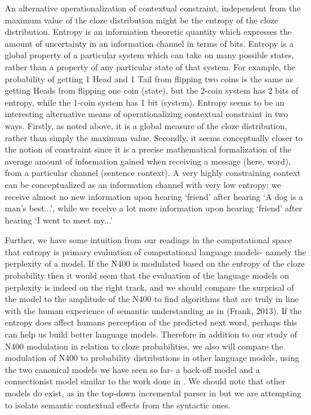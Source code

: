 \documentclass{article}
\begin{document}
An alternative operationalization of contextual constraint, independent from the maximum value of the cloze distribution might be the entropy of the cloze distribution. Entropy is an information theoretic quantity which expresses the amount of uncertainty in an information channel in terms of bits.  Entropy is a global property of a particular system which can take on many possible states, rather than a property of any particular state of that system. For example, the probability of getting 1 Head and 1 Tail from flipping two coins is the same as getting Heads from flipping one  coin (state), but the 2-coin system has 2 bits of entropy, while the 1-coin system has 1 bit (system). Entropy seems to be an interesting alternative means of operationalizing contextual constraint in two ways. Firstly, as noted above, it is a global measure of the cloze distribution, rather than simply the maximum value. Secondly, it seems conceptually closer to the notion of constraint since it is a precise mathematical formalization of the average amount of information gained when receiving a message (here, word), from a particular channel (sentence context). A very highly constraining context can be conceptualized as an information channel with very low entropy: we receive almost no new information upon hearing ‘friend’ after hearing ‘A dog is a man’s best...’, while we receive a lot more information upon hearing ‘friend’ after hearing ‘I went to meet my...’

Further, we have some intuition from our readings in the computational space that entropy is primary evaluation of computational language models- namely the perplexity of a model. If the N400 is modulated based on the entropy of the cloze probability then it would seem that the evaluation of the language models on perplexity is indeed on the right track, and we should compare the surprisal of the model to the amplitude of the N400 to find algorithms that are truly in line with the human experience of semantic understanding as in \cite{frank2013word} (Frank, 2013). If the entropy does affect humans perception of the predicted next word, perhaps this can help us build better language models. Therefore in addition to our study of N400 modulation in relation to cloze probabilities, we also will compare the modulation of N400 to probability distributions in other language models, using the two canonical models we have seen so far- a back-off model and a connectionist model similar to the work done in \cite{frank2009surprisal,demberg2009computational}. We should note that other models do exist, as in the top-down incremental parser in \cite{roark2009deriving} but we are attempting to isolate semantic contextual effects from the syntactic ones. 
\end{document}
